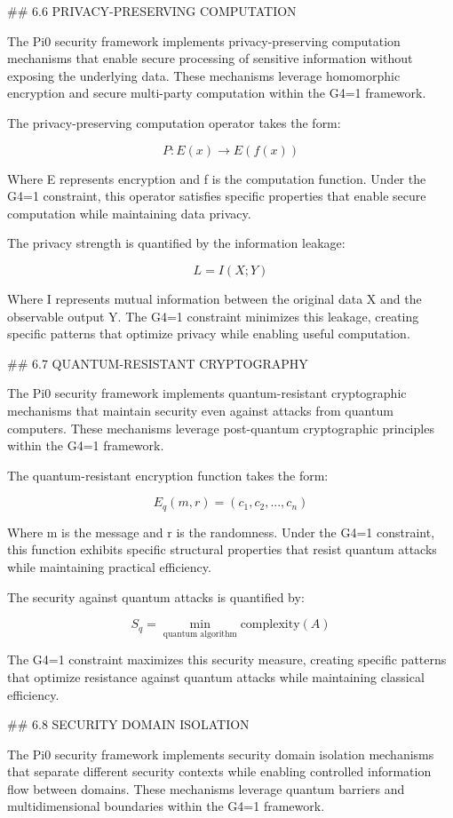 ## 6.6 PRIVACY-PRESERVING COMPUTATION

The Pi0 security framework implements privacy-preserving computation mechanisms that enable secure processing of sensitive information without exposing the underlying data. These mechanisms leverage homomorphic encryption and secure multi-party computation within the G4=1 framework.

The privacy-preserving computation operator takes the form:

$$P: E(x) \rightarrow E(f(x))$$

Where E represents encryption and f is the computation function. Under the G4=1 constraint, this operator satisfies specific properties that enable secure computation while maintaining data privacy.

The privacy strength is quantified by the information leakage:

$$L = I(X; Y)$$

Where I represents mutual information between the original data X and the observable output Y. The G4=1 constraint minimizes this leakage, creating specific patterns that optimize privacy while enabling useful computation.

## 6.7 QUANTUM-RESISTANT CRYPTOGRAPHY

The Pi0 security framework implements quantum-resistant cryptographic mechanisms that maintain security even against attacks from quantum computers. These mechanisms leverage post-quantum cryptographic principles within the G4=1 framework.

The quantum-resistant encryption function takes the form:

$$E_q(m, r) = (c_1, c_2, ..., c_n)$$

Where m is the message and r is the randomness. Under the G4=1 constraint, this function exhibits specific structural properties that resist quantum attacks while maintaining practical efficiency.

The security against quantum attacks is quantified by:

$$S_q = \min_{\text{quantum algorithm}} \text{complexity}(A)$$

The G4=1 constraint maximizes this security measure, creating specific patterns that optimize resistance against quantum attacks while maintaining classical efficiency.

## 6.8 SECURITY DOMAIN ISOLATION

The Pi0 security framework implements security domain isolation mechanisms that separate different security contexts while enabling controlled information flow between domains. These mechanisms leverage quantum barriers and multidimensional boundaries within the G4=1 framework.

